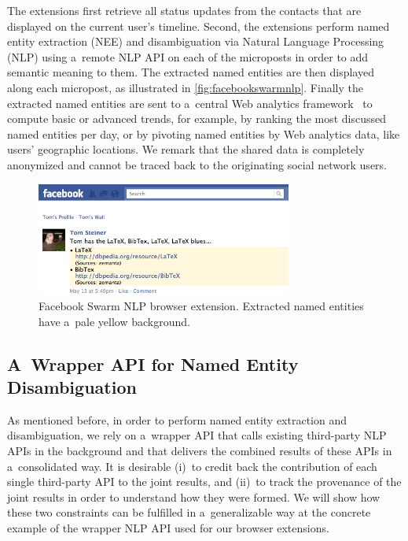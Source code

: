 The extensions first retrieve all status updates
from the contacts that are displayed
on the current user's timeline.
Second, the extensions perform named entity extraction (NEE)
and disambiguation via Natural Language Processing (NLP)
using a~remote NLP API on each of the microposts
in order to add semantic meaning to them.
The extracted named entities are then displayed
along each micropost, as illustrated in \autoref{fig:facebookswarmnlp}.
Finally the extracted named entities
are sent to a~central Web analytics framework~\cite{kaushik2009analytics}
to compute basic or advanced trends, for example,
by ranking the most discussed named entities per day,
or by pivoting named entities by Web analytics data,
like users' geographic locations.
We remark that the shared data is completely anonymized
and cannot be traced back to the originating social network users.

\begin{figure}[!ht]
  \centering
  \includegraphics[width=0.75\textwidth]{facebook-swarm-nlp.png}
  \caption[Facebook Swarm NLP browser extension]
    {Facebook Swarm NLP browser extension.
    Extracted named entities have a~pale yellow background.}
  \label{fig:facebookswarmnlp}
\end{figure}

\subsection{A~Wrapper API for Named Entity Disambiguation}
\label{sec:wrapperapi}

As mentioned before, in order to perform named entity extraction
and disambiguation, we rely on a~wrapper API
that calls existing third-party NLP APIs in the background
and that delivers the combined results of these APIs
in a~consolidated way.
It is  desirable
(i)~to credit back the contribution of each single third-party API
to the joint results, and
(ii)~to track the provenance of the joint results
in order to understand how they were formed.
We will show how these two constraints
can be fulfilled in a~generalizable way
at the concrete example of the wrapper NLP API
used for our browser extensions.


